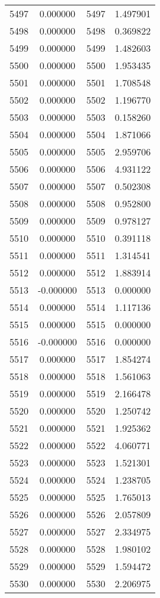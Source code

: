 \documentclass[12pt]{article}
\begin{document}
\begin{longtable}{@{}cccc@{}}
5497 & 0.000000 & 5497 & 1.497901 \\
5498 & 0.000000 & 5498 & 0.369822 \\
5499 & 0.000000 & 5499 & 1.482603 \\
5500 & 0.000000 & 5500 & 1.953435 \\
5501 & 0.000000 & 5501 & 1.708548 \\
5502 & 0.000000 & 5502 & 1.196770 \\
5503 & 0.000000 & 5503 & 0.158260 \\
5504 & 0.000000 & 5504 & 1.871066 \\
5505 & 0.000000 & 5505 & 2.959706 \\
5506 & 0.000000 & 5506 & 4.931122 \\
5507 & 0.000000 & 5507 & 0.502308 \\
5508 & 0.000000 & 5508 & 0.952800 \\
5509 & 0.000000 & 5509 & 0.978127 \\
5510 & 0.000000 & 5510 & 0.391118 \\
5511 & 0.000000 & 5511 & 1.314541 \\
5512 & 0.000000 & 5512 & 1.883914 \\
5513 & -0.000000 & 5513 & 0.000000 \\
5514 & 0.000000 & 5514 & 1.117136 \\
5515 & 0.000000 & 5515 & 0.000000 \\
5516 & -0.000000 & 5516 & 0.000000 \\
5517 & 0.000000 & 5517 & 1.854274 \\
5518 & 0.000000 & 5518 & 1.561063 \\
5519 & 0.000000 & 5519 & 2.166478 \\
5520 & 0.000000 & 5520 & 1.250742 \\
5521 & 0.000000 & 5521 & 1.925362 \\
5522 & 0.000000 & 5522 & 4.060771 \\
5523 & 0.000000 & 5523 & 1.521301 \\
5524 & 0.000000 & 5524 & 1.238705 \\
5525 & 0.000000 & 5525 & 1.765013 \\
5526 & 0.000000 & 5526 & 2.057809 \\
5527 & 0.000000 & 5527 & 2.334975 \\
5528 & 0.000000 & 5528 & 1.980102 \\
5529 & 0.000000 & 5529 & 1.594472 \\
5530 & 0.000000 & 5530 & 2.206975 \\

\end{longtable}
\end{document}
